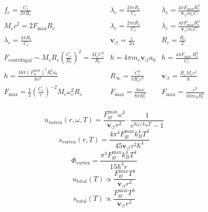 \documentclass[a4paper,10pt]{article}
\begin{document}
    \begin{equation*}
    \begin{array}{ccc}
            f_e = \frac{C_e}{2 \pi R_c} & \lambda_c = \frac{2 \pi c R_c}{C_e} & \lambda_c = \frac{4 \pi F_{\max } R_c^2}{\mathbf{v}_{\scriptscriptstyle\boldsymbol{\circlearrowleft}} m_e C} \\
            M_e c^2 = 2 F_{\max } R_c & \lambda_c = \frac{2 \pi c R_c}{C_e} & \lambda_c = \frac{4 \pi F_{\max } R_c^2}{\mathbf{v}_{\scriptscriptstyle\boldsymbol{\circlearrowleft}} m_e C} \\
            \lambda_c = \frac{4 \pi R_c}{C_e} & \mathbf{v}_{\scriptscriptstyle\boldsymbol{\circlearrowleft}} = \frac{c}{2 \alpha} & R_c = \frac{R_e}{2} \\
            F_\text{centrifugal} \sim M_e R_c \left(\frac{C_e}{R_c}\right)^2 = \frac{M_e C_e^2}{R_c} & h = 4 \pi m_e \mathbf{v}_{\scriptscriptstyle\boldsymbol{\circlearrowleft}} a_0 & h = \frac{4 \pi F_\text {max } R_e^2}{C_e} \\
            h = \frac{16 \pi (F^{\text{max}}_{\text{\ae}})^2 R_c^3 a_0}{\hbar c^2} & R_\infty = \frac{C_e^3}{\pi R_c c^3} & \mathbf{v}_{\scriptscriptstyle\boldsymbol{\circlearrowleft}} = \frac{R_c M_e c^2}{\hbar} \\
            F_{\max} = \frac{1}{2} \left( \frac{C_e}{c} \right)^{-2} M_e \omega_c^2 R_c & F_{\max} = \frac{h \alpha c}{8 \pi R_c^2} & F_{\max} = \frac{e^2}{16 \pi \varepsilon_0 R_c^2} \\
    \end{array}
    \end{equation*}


\begin{equation*}
    u_\text{vortex}(r, \omega, T) = \frac{F^{\text{max}}_{\text{gr}} \omega^3}{\mathbf{v}_{\scriptscriptstyle\boldsymbol{\circlearrowleft}} r^2} \cdot \frac{1}{e^{\hbar \omega / k_B T} - 1}
\end{equation*}
\begin{equation*}
    s_\text{vortex}(r, T) = \frac{4 \pi^4 F^{\text{max}}_{\text{gr}} k_B^4 T^3}{45 \mathbf{v}_{\scriptscriptstyle\boldsymbol{\circlearrowleft}} r^2 \hbar^4}
\end{equation*}
\begin{equation*}
    \Phi_\text{vortex} = \frac{\pi^4 F^{\text{max}}_{\text{gr}} k_B^4 T^4}{15 \hbar^4 r}
\end{equation*}
\begin{equation*}
    u_\text{total}(T) \propto \frac{F^{\text{max}}_{\text{gr}} T^4}{\mathbf{v}_{\scriptscriptstyle\boldsymbol{\circlearrowleft}} r^2}
\end{equation*}
\begin{equation*}
    s_\text{total}(T) \propto \frac{F^{\text{max}}_{\text{gr}} T^3}{\mathbf{v}_{\scriptscriptstyle\boldsymbol{\circlearrowleft}} r^2}
\end{equation*}
\end{document}

